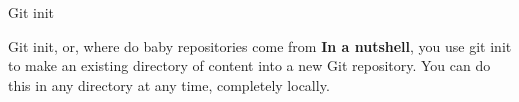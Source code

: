 \begin{frame}{Git init}
    \begin{block}{Git init, or, where do baby repositories come from}
    \textbf{In a nutshell}, you use git init to make an existing directory of content into a new Git repository.
    You can do this in any directory at any time, completely locally.
    
    \end{block}
\end{frame}
